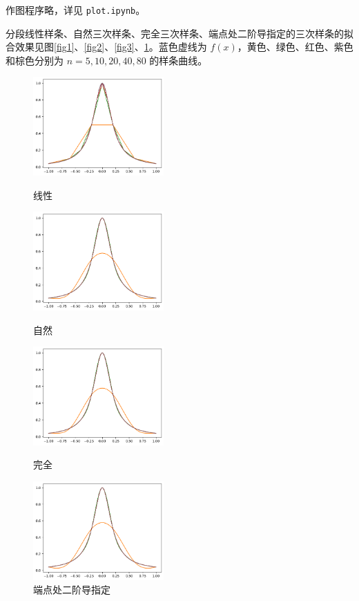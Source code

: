 \documentclass{ctexart}
\begin{document}
作图程序略，详见 \verb|plot.ipynb|。

分段线性样条、自然三次样条、完全三次样条、端点处二阶导指定的三次样条的拟合效果见图\ref{fig1}、\ref{fig2}、\ref{fig3}、\ref{fig4}。蓝色虚线为 $f(x)$，黄色、绿色、红色、紫色和棕色分别为 $n=5,10,20,40,80$ 的样条曲线。

\begin{figure}[htbp]
\centering
\begin{minipage}{5cm}
    \centering
    \includegraphics[width=5cm]{a1.png}
    \caption{线性}
    \label{fig1}
\end{minipage}
\qquad
\begin{minipage}{5cm}
    \centering
    \includegraphics[width=5cm]{a3.png}
    \caption{自然}
    \label{fig2}
\end{minipage}
\begin{minipage}{5cm}
    \centering
    \includegraphics[width=5cm]{a2.png}
    \caption{完全}
    \label{fig3}
\end{minipage}
\qquad
\begin{minipage}{5cm}
    \centering
    \includegraphics[width=5cm]{a4.png}
    \caption{端点处二阶导指定}
    \label{fig4}
\end{minipage}
\end{figure}
\end{document}
